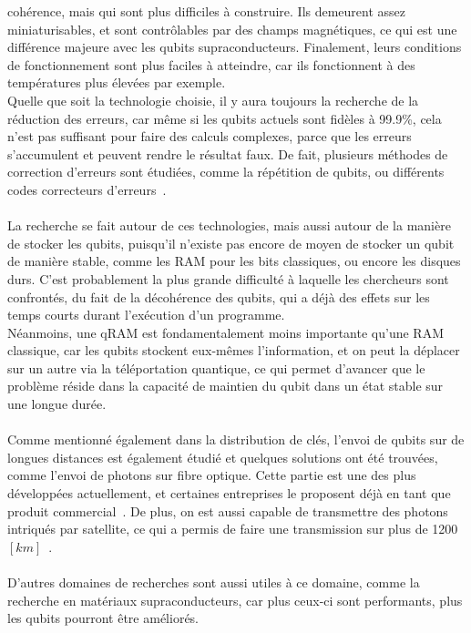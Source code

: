 cohérence, mais qui sont plus difficiles à construire.
Ils demeurent assez miniaturisables, et sont contrôlables par des champs magnétiques, ce qui est
une différence majeure avec les qubits supraconducteurs.
Finalement, leurs conditions de fonctionnement sont plus faciles à atteindre, car ils fonctionnent
à des températures plus élevées par exemple.\\
Quelle que soit la technologie choisie, il y aura toujours la recherche de la réduction des erreurs,
car même si les qubits actuels sont fidèles à 99.9\%, cela n'est pas suffisant pour faire des
calculs complexes, parce que les erreurs s'accumulent et peuvent rendre le résultat faux.
De fait, plusieurs méthodes de correction d'erreurs sont étudiées, comme la répétition de qubits,
ou différents codes correcteurs d'erreurs~\cite{wiki:quantum-error-correction}.\\ \\
La recherche se fait autour de ces technologies, mais aussi autour de la manière de
stocker les qubits, puisqu'il n'existe pas encore de moyen de stocker un qubit de manière
stable, comme les RAM pour les bits classiques, ou encore les disques durs.
C'est probablement la plus grande difficulté à laquelle les chercheurs sont confrontés,
du fait de la décohérence des qubits, qui a déjà des effets sur les temps courts durant
l'exécution d'un programme.\\
Néanmoins, une qRAM est fondamentalement moins importante qu'une RAM classique, car
les qubits stockent eux-mêmes l'information, et on peut la déplacer sur un autre via
la téléportation quantique, ce qui permet d'avancer que le problème réside dans la
capacité de maintien du qubit dans un état stable sur une longue durée.\\ \\
Comme mentionné également dans la distribution de clés, l'envoi de qubits sur de longues
distances est également étudié et quelques solutions ont été trouvées, comme l'envoi
de photons sur fibre optique.
Cette partie est une des plus développées actuellement, et certaines entreprises
le proposent déjà en tant que produit commercial~\cite{idquantique}.
De plus, on est aussi capable de transmettre des photons intriqués par satellite,
ce qui a permis de faire une transmission sur plus de 1200 $[km]$~\cite{Liao2017}.\\ \\
D'autres domaines de recherches sont aussi utiles à ce domaine, comme la recherche
en matériaux supraconducteurs, car plus ceux-ci sont performants, plus les qubits
pourront être améliorés.
